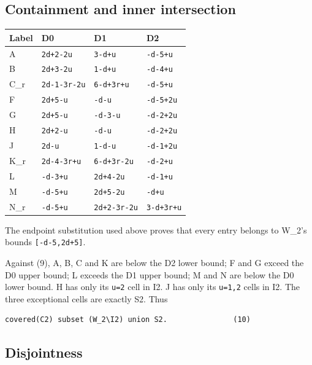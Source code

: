 \documentclass[
  10pt,
]{scrreprt}
\begin{document}
\subsection{Containment and inner
intersection}\label{edition-4-section-7}

\begin{longtable}[]{@{}llll@{}}
\toprule\noalign{}
Label & D0 & D1 & D2 \\
\midrule\noalign{}
\endhead
\bottomrule\noalign{}
\endlastfoot
A & \texttt{2d+2-2u} & \texttt{3-d+u} & \texttt{-d-5+u} \\
B & \texttt{2d+3-2u} & \texttt{1-d+u} & \texttt{-d-4+u} \\
C\_r & \texttt{2d-1-3r-2u} & \texttt{6-d+3r+u} & \texttt{-d-5+u} \\
F & \texttt{2d+5-u} & \texttt{-d-u} & \texttt{-d-5+2u} \\
G & \texttt{2d+5-u} & \texttt{-d-3-u} & \texttt{-d-2+2u} \\
H & \texttt{2d+2-u} & \texttt{-d-u} & \texttt{-d-2+2u} \\
J & \texttt{2d-u} & \texttt{1-d-u} & \texttt{-d-1+2u} \\
K\_r & \texttt{2d-4-3r+u} & \texttt{6-d+3r-2u} & \texttt{-d-2+u} \\
L & \texttt{-d-3+u} & \texttt{2d+4-2u} & \texttt{-d-1+u} \\
M & \texttt{-d-5+u} & \texttt{2d+5-2u} & \texttt{-d+u} \\
N\_r & \texttt{-d-5+u} & \texttt{2d+2-3r-2u} & \texttt{3-d+3r+u} \\
\end{longtable}

The endpoint substitution used above proves that every entry belongs to
W\_2's bounds \texttt{{[}-d-5,2d+5{]}}.

Against (9), A, B, C and K are below the D2 lower bound; F and G exceed
the D0 upper bound; L exceeds the D1 upper bound; M and N are below the
D0 lower bound. H has only its \texttt{u=2} cell in I2. J has only its
\texttt{u=1,2} cells in I2. The three exceptional cells are exactly S2.
Thus

\begin{verbatim}
covered(C2) subset (W_2\I2) union S2.               (10)
\end{verbatim}

\subsection{Disjointness}\label{edition-4-section-8}
\end{document}
